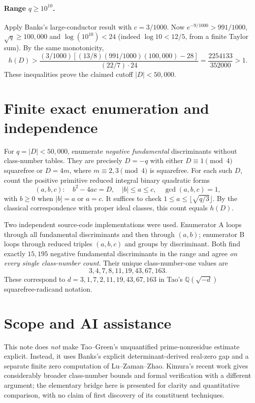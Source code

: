 \documentclass[10pt,a4paper]{article}
\begin{document}
\paragraph{Range $q\ge10^{10}$.}
Apply Banks's large-conductor result \cite{banks} with $c=3/1000$.
Now $e^{-9/1000}>991/1000$, $\sqrt q\ge100{,}000$ and
$\log(10^{10})<24$ (indeed $\log10<12/5$, from a finite Taylor sum).
By the same monotonicity,
\[
 h(D)>\frac{(3/1000)\left[(13/8)(991/1000)(100{,}000)-28\right]}
                  {(22/7)\cdot24}
       =\frac{2254133}{352000}>1.
\]
These inequalities prove the claimed cutoff $|D|<50{,}000$.

\section{Finite exact enumeration and independence}
For $q=|D|<50{,}000$, enumerate \emph{negative fundamental}
discriminants without class-number tables. They are precisely
$D=-q$ with either $D\equiv1\pmod4$ squarefree or
$D=4m$, where $m\equiv2,3\pmod4$ is squarefree.
For each such $D$, count the positive primitive reduced integral
binary quadratic forms
\[
 (a,b,c):\quad b^2-4ac=D,\quad |b|\le a\le c,\quad
 \gcd(a,b,c)=1,
\]
with $b\ge0$ when $|b|=a$ or $a=c$. It suffices to check
$1\le a\le\lfloor\sqrt{q/3}\rfloor$.
By the classical correspondence with proper ideal classes, this
count equals $h(D)$.

Two independent source-code implementations were used. Enumerator A loops
through all fundamental discriminants and then through $(a,b)$; enumerator B
loops through reduced triples $(a,b,c)$ and groups by discriminant. Both
find exactly $15{,}195$ negative fundamental discriminants in the
range and agree \emph{on every single class-number count}. Their unique
class-number-one values are
\[
  \boxed{3,4,7,8,11,19,43,67,163.}
\]
These correspond to $d=3,1,7,2,11,19,43,67,163$ in Tao's
$\mathbb Q(\sqrt{-d})$ squarefree-radicand notation.

\section{Scope and AI assistance}
This note does \emph{not} make Tao--Green's unquantified prime-nonresidue
estimate explicit. Instead, it uses Banks's explicit determinant-derived
real-zero gap and a separate finite zero computation of Lu--Zaman--Zhao.
Kimura's recent work \cite{kimura} gives considerably broader class-number bounds and
formal verification with a different argument; the elementary bridge here
is presented for clarity and quantitative comparison, with no claim of
first discovery of its constituent techniques.
\end{document}
